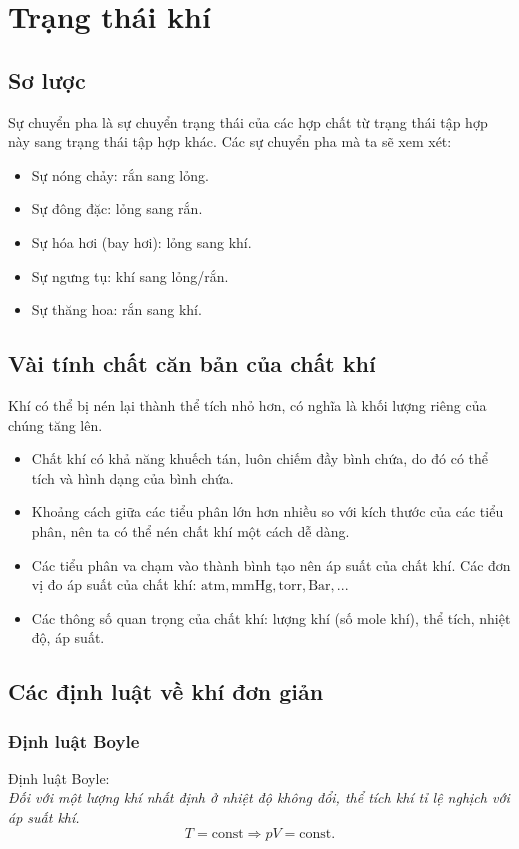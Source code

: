 \chapter{Trạng thái khí}
\section{Sơ lược}
Sự chuyển pha là sự chuyển trạng thái của các hợp chất từ trạng thái tập hợp này sang trạng thái tập hợp khác. Các sự chuyển pha mà ta sẽ xem xét:
\begin{itemize}
\item Sự nóng chảy: rắn sang lỏng.
\item Sự đông đặc: lỏng sang rắn.
\item Sự hóa hơi (bay hơi): lỏng sang khí.
\item Sự ngưng tụ: khí sang lỏng/rắn.
\item Sự thăng hoa: rắn sang khí.
\end{itemize}
\section{Vài tính chất căn bản của chất khí}
Khí có thể bị nén lại thành thể tích nhỏ hơn, có nghĩa là khối lượng riêng của chúng tăng lên.
\begin{itemize}
\item Chất khí có khả năng khuếch tán, luôn chiếm đầy bình chứa, do đó có thể tích và hình dạng của bình chứa. 
\item Khoảng cách giữa các tiểu phân lớn hơn nhiều so với kích thước của các tiểu phân, nên ta có thể nén chất khí một cách dễ dàng.
\item Các tiểu phân va chạm vào thành bình tạo nên áp suất của chất khí. Các đơn vị đo áp suất của chất khí: $\mathrm{atm}, \mathrm{mmHg}, \mathrm{torr}, \mathrm{Bar}, ...$
\item Các thông số quan trọng của chất khí: lượng khí (số mole khí), thể tích, nhiệt độ, áp suất.
\end{itemize}
\section{Các định luật về khí đơn giản}
\subsection{Định luật Boyle}
Định luật Boyle:\\
\textit{Đối với một lượng khí nhất định ở nhiệt độ không đổi, thể tích khí tỉ lệ nghịch với áp suất khí.}
$$T = \mathrm{const} \Rightarrow pV = \mathrm{const}.$$
